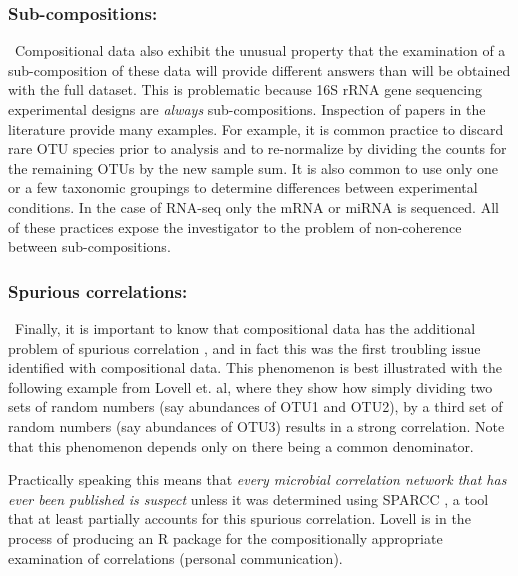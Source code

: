 \documentclass[11pt]{article}\usepackage[]{graphicx}\usepackage[]{color}
\begin{document}
\subsubsection{Sub-compositions:}~Compositional data also exhibit the unusual property that the examination of a sub-composition of these data will provide different answers than will be obtained with the full dataset\cite{Aitchison:1986}. This is problematic because 16S rRNA gene sequencing experimental designs are \emph{always} sub-compositions. Inspection of papers in the literature provide many examples. For example, it is common practice to discard rare OTU species prior to analysis and to re-normalize by dividing the counts for the remaining OTUs by the new sample sum. It is also common to use only one or a few taxonomic groupings to determine differences between experimental conditions. In the case of RNA-seq only the mRNA or miRNA is sequenced. All of these practices expose the investigator to the problem of non-coherence between sub-compositions.

\subsubsection{Spurious correlations:}~Finally, it is important to know that compositional data has the additional problem of  spurious correlation \cite{Pearson:1896}, and in fact this was the first troubling issue identified with compositional data. This phenomenon is best illustrated with  the following example from Lovell et. al\cite{Lovell:2015aa}, where they show how simply dividing two sets of random numbers (say abundances of OTU1 and OTU2), by a third set of random numbers (say abundances of OTU3) results in a strong correlation. Note that this phenomenon depends only on there being a common denominator.

Practically speaking this means that \emph{every microbial correlation network that has ever been published is suspect} unless it was determined using SPARCC \cite{Friedman:2012}, a tool that at least partially accounts for this spurious correlation. Lovell is in the process of producing an R package for the compositionally appropriate examination of correlations (personal communication).
\end{document}
